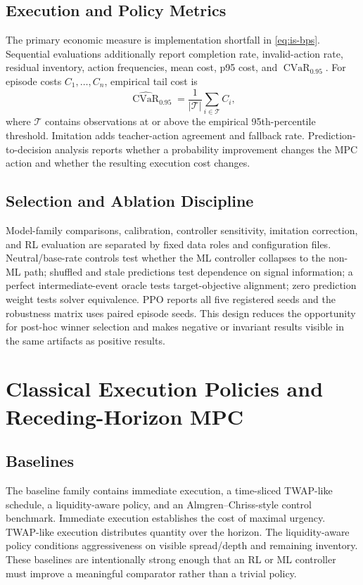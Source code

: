 \documentclass[journal,10pt]{IEEEtran}
\newcommand{\1}{\mathbf{1}}
\newcommand{\CVaR}{\operatorname{CVaR}}
\begin{document}
\subsection{Execution and Policy Metrics}
The primary economic measure is implementation shortfall in \cref{eq:is-bps}. Sequential evaluations additionally report completion rate, invalid-action rate, residual inventory, action frequencies, mean cost, p95 cost, and $\CVaR_{0.95}$. For episode costs $C_1,\ldots,C_n$, empirical tail cost is
\begin{equation}
\widehat{\CVaR}_{0.95}=\frac{1}{|\mathcal{T}|}\sum_{i\in\mathcal{T}} C_i,
\end{equation}
where $\mathcal{T}$ contains observations at or above the empirical 95th-percentile threshold. Imitation adds teacher-action agreement and fallback rate. Prediction-to-decision analysis reports whether a probability improvement changes the MPC action and whether the resulting execution cost changes.

\subsection{Selection and Ablation Discipline}
Model-family comparisons, calibration, controller sensitivity, imitation correction, and RL evaluation are separated by fixed data roles and configuration files. Neutral/base-rate controls test whether the ML controller collapses to the non-ML path; shuffled and stale predictions test dependence on signal information; a perfect intermediate-event oracle tests target-objective alignment; zero prediction weight tests solver equivalence. PPO reports all five registered seeds and the robustness matrix uses paired episode seeds. This design reduces the opportunity for post-hoc winner selection and makes negative or invariant results visible in the same artifacts as positive results.

\section{Classical Execution Policies and Receding-Horizon MPC}
\label{sec:mpc}
\subsection{Baselines}
The baseline family contains immediate execution, a time-sliced TWAP-like schedule, a liquidity-aware policy, and an Almgren--Chriss-style control benchmark. Immediate execution establishes the cost of maximal urgency. TWAP-like execution distributes quantity over the horizon. The liquidity-aware policy conditions aggressiveness on visible spread/depth and remaining inventory. These baselines are intentionally strong enough that an RL or ML controller must improve a meaningful comparator rather than a trivial policy.
\end{document}
